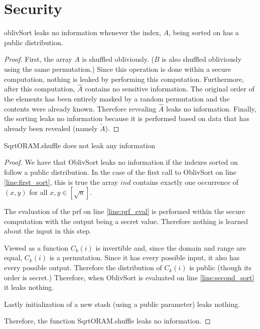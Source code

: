 
\section{Security}

\begin{lemma}
oblivSort leaks no information whenever the index, $A$, being sorted on
has a public distribution.
\end{lemma}

\begin{proof}
First, the array $A$ is shuffled obliviously.
($B$ is also shuffled obliviously using the same permutation.)
Since this operation is done within a secure computation,
nothing is leaked by performing this computation.
Furthermore, after this computation, $\hat{A}$ contains
no sensitive information.
The original order of the elements has been entirely masked by a
random permutation and the contents were already known.
Therefore revealing $\hat{A}$ leaks no information.
Finally, the sorting leaks no information because it is performed
based on data that has already been revealed (namely $\tilde{A}$).
\end{proof}

\begin{theorem}
SqrtORAM.shuffle does not leak any information
\end{theorem}

\begin{proof}
We have that OblivSort leaks no information if the indexes sorted on
follow a public distribution. In the case of the first call
to OblivSort on line \ref{line:first_sort}, this is true
the array $ind$ contains exactly one occurrence of $(x, y)$ 
for all $x, y \in [\sqrt{n}]$.

The evaluation of the prf on line \ref{line:prf_eval} is performed
within the secure computation with the output being a secret value.
Therefore nothing is learned about the input in this step.

Viewed as a function $C_k(i)$ is invertible and, since the domain and range
are equal, $C_k(i)$ is a permutation. 
Since it has every possible input, it also has every possible output.
Therefore the distribution of $C_k(i)$ is public (though its order is secret.)
Therefore, when OblivSort is evaluated on line \ref{line:second_sort} 
it leaks nothing.

Lastly initialization of a new stash (using a public parameter) leaks nothing.

Therefore, the function SqrtORAM.shuffle leaks no information.
\end{proof}

